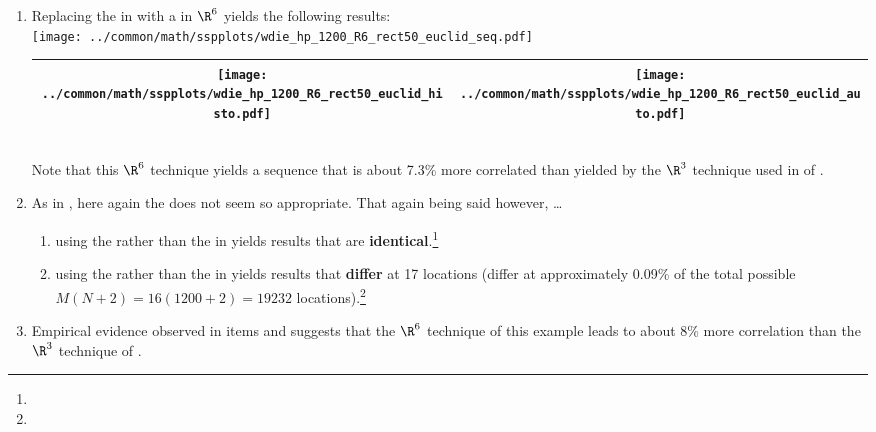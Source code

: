 \begin{example}
\begin{enumerate}
  \item \label{item:wdie_hp_R6_rect50_euclid}
        Replacing the  in 
        with a  in $\R^6$ yields the following results:
        \\\texttt{[image: ../common/math/sspplots/wdie\_hp\_1200\_R6\_rect50\_euclid\_seq.pdf]}
        \\\begin{tabular}{|>{\scs}c|>{\scs}c|}
             \hline
             \texttt{[image: ../common/math/sspplots/wdie\_hp\_1200\_R6\_rect50\_euclid\_histo.pdf]}
            &\texttt{[image: ../common/math/sspplots/wdie\_hp\_1200\_R6\_rect50\_euclid\_auto.pdf]}
           \\\hline
        \end{tabular}\\
     Note that this $\R^6$ technique yields a sequence that is about 7.3\% more correlated than yielded by the $\R^3$ technique
     used in  of .

  \item As in , here again the  does not seem so appropriate.
        That again being said however, \ldots 
    \begin{enumerate}
      \item using the  rather than the  in 
             yields results that are 
            \textbf{identical}.\footnote{} %
      \item using the  rather than the  in 
             yields results that \textbf{differ} at 17 locations
            (differ at approximately 0.09\% of the total possible $M(N+2)=16(1200+2)=19232$ 
            locations).\footnote{} %
    \end{enumerate}

  \item Empirical evidence observed in items
                     and
        suggests that the $\R^6$ technique of this example leads to about 8\% more correlation 
        than the $\R^3$ technique of .

\end{enumerate}
\end{example}



